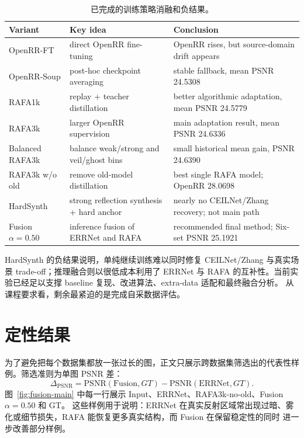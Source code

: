 \documentclass{article}
\begin{document}
\begin{table}[!htbp]
\centering
\caption{已完成的训练策略消融和负结果。}
\label{tab:ablation}
\begin{tabular}{lll}
\toprule
Variant & Key idea & Conclusion \\
\midrule
OpenRR-FT & direct OpenRR fine-tuning & OpenRR rises, but source-domain drift appears \\
OpenRR-Soup & post-hoc checkpoint averaging & stable fallback, mean PSNR 24.5308 \\
RAFA1k & replay + teacher distillation & better algorithmic adaptation, mean PSNR 24.5779 \\
RAFA3k & larger OpenRR supervision & main adaptation result, mean PSNR 24.6336 \\
Balanced RAFA3k & balance weak/strong and veil/ghost bins & small historical mean gain, PSNR 24.6390 \\
RAFA3k w/o old & remove old-model distillation & best single RAFA model; OpenRR 28.0698 \\
HardSynth & strong reflection synthesis + hard anchor & nearly no CEILNet/Zhang recovery; not main path \\
Fusion $\alpha=0.50$ & inference fusion of ERRNet and RAFA & recommended final method; Six-set PSNR 25.1921 \\
\bottomrule
\end{tabular}
\end{table}

HardSynth 的负结果说明，单纯继续训练难以同时修复 CEILNet/Zhang 与真实场景 trade-off；推理融合则以很低成本利用了
ERRNet 与 RAFA 的互补性。当前实验已经足以支撑 baseline 复现、改进算法、extra-data 适配和最终融合分析。
从课程要求看，剩余最紧迫的是完成自采数据评估。

\section{定性结果}

为了避免把每个数据集都放一张过长的图，正文只展示跨数据集筛选出的代表性样例。筛选准则为单图 PSNR 差：
\begin{equation}
\Delta_{\mathrm{PSNR}}=\mathrm{PSNR}(\mathrm{Fusion},GT)-\mathrm{PSNR}(\mathrm{ERRNet},GT).
\end{equation}
图~\ref{fig:fusion-main} 中每一行展示 Input、ERRNet、RAFA3k-no-old、Fusion $\alpha=0.50$ 和 GT。
这些样例用于说明：ERRNet 在真实反射区域常出现过暗、雾化或细节损失，RAFA 能恢复更多真实结构，而 Fusion 在保留稳定性的同时
进一步改善部分样例。
\end{document}

